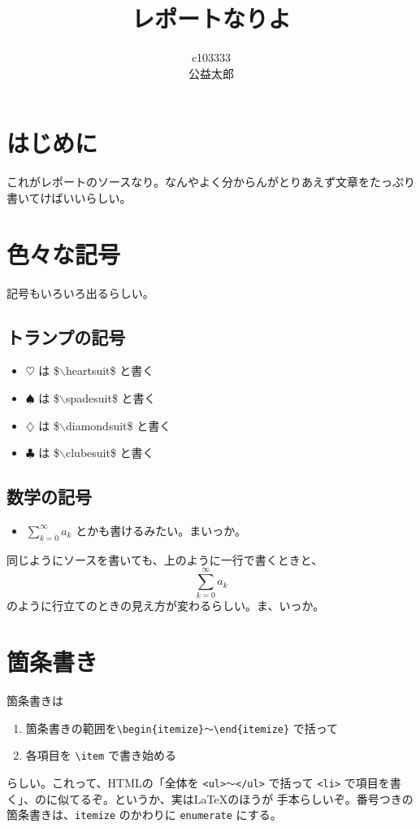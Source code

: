 \documentclass{jarticle}
\title{レポートなりよ}
\author{c103333\\公益太郎}
\begin{document}
\maketitle
\section{はじめに}

これがレポートのソースなり。なんやよく分からんがとりあえず文章をたっぷり
書いてけばいいらしい。

 \section{色々な記号}
 
 記号もいろいろ出るらしい。

  \subsection{トランプの記号}

  \begin{itemize}
   \item $\heartsuit$ は \$$\backslash$heartsuit\$ と書く
   \item $\spadesuit$ は \$$\backslash$spadesuit\$ と書く
   \item $\diamondsuit$ は \$$\backslash$diamondsuit\$ と書く
   \item $\clubsuit$ は \$$\backslash$clubesuit\$ と書く
  \end{itemize}

  \subsection{数学の記号}

  \begin{itemize}
   \item $\sum_{k=0}^{\infty}a_{k}$ とかも書けるみたい。まいっか。
  \end{itemize}
  同じようにソースを書いても、上のように一行で書くときと、
  \begin{equation}
   \sum_{k=0}^{\infty}a_{k}
  \end{equation}
  のように行立てのときの見え方が変わるらしい。ま、いっか。

 \section{箇条書き}

 箇条書きは
 \begin{enumerate}
  \item 箇条書きの範囲を\verb|\begin{itemize}〜\end{itemize}| で括って
  \item 各項目を \verb|\item| で書き始める
 \end{enumerate}
 らしい。これって、HTMLの「全体を \verb|<ul>〜</ul>| で括って 
 \verb|<li>| で項目を書く」、のに似てるぞ。というか、実は\LaTeX のほうが
 手本らしいぞ。番号つきの箇条書きは、\verb|itemize| のかわりに
 \verb|enumerate| にする。
\end{document}
